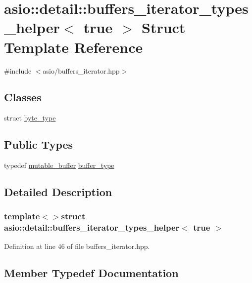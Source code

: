 \hypertarget{structasio_1_1detail_1_1buffers__iterator__types__helper_3_01true_01_4}{}\section{asio\+:\+:detail\+:\+:buffers\+\_\+iterator\+\_\+types\+\_\+helper$<$ true $>$ Struct Template Reference}
\label{structasio_1_1detail_1_1buffers__iterator__types__helper_3_01true_01_4}


{\ttfamily \#include $<$asio/buffers\+\_\+iterator.\+hpp$>$}

\subsection*{Classes}
\begin{DoxyCompactItemize}
\item 
struct \hyperlink{structasio_1_1detail_1_1buffers__iterator__types__helper_3_01true_01_4_1_1byte__type}{byte\+\_\+type}
\end{DoxyCompactItemize}
\subsection*{Public Types}
\begin{DoxyCompactItemize}
\item 
typedef \hyperlink{classasio_1_1mutable__buffer}{mutable\+\_\+buffer} \hyperlink{structasio_1_1detail_1_1buffers__iterator__types__helper_3_01true_01_4_afadfeb16c850d47114205f7d4b671bd5}{buffer\+\_\+type}
\end{DoxyCompactItemize}


\subsection{Detailed Description}
\subsubsection*{template$<$$>$struct asio\+::detail\+::buffers\+\_\+iterator\+\_\+types\+\_\+helper$<$ true $>$}



Definition at line 46 of file buffers\+\_\+iterator.\+hpp.



\subsection{Member Typedef Documentation}
\hypertarget{structasio_1_1detail_1_1buffers__iterator__types__helper_3_01true_01_4_afadfeb16c850d47114205f7d4b671bd5}{}
